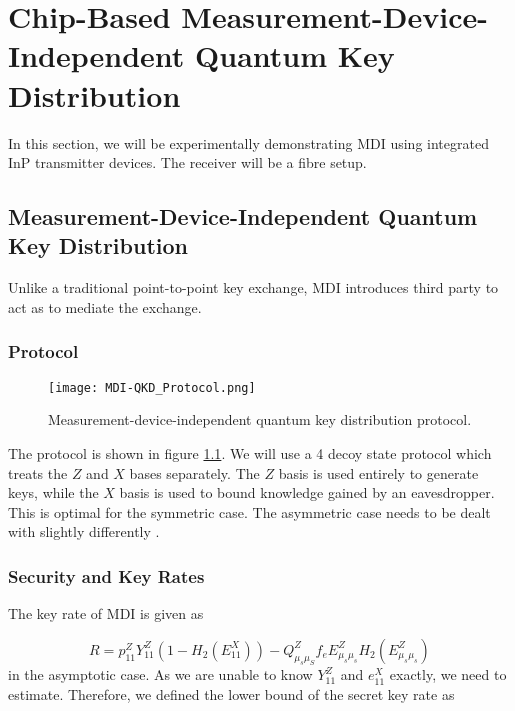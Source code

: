 %
%
\graphicspath{{./chapters/chapter04/fig04/}}

\let\textcircled=\pgftextcircled
\chapter[Chip-Based Measurement-Device-Independent QKD]{Chip-Based Measurement-Device-Independent Quantum Key Distribution}
\label{chap:mdiqkd}

In this section, we will be experimentally demonstrating \ac{MDI} \cite{mdi-qkd} using integrated \ac{InP} transmitter devices. The receiver will be a fibre setup.

\section{Measurement-Device-Independent Quantum Key Distribution}
\label{sec:mdi-qkd}

Unlike a traditional point-to-point key exchange, \ac{MDI} introduces third party to act as to mediate the exchange.  

\subsection{Protocol}

\begin{figure}[tbp]
	\centering
	\texttt{[image: MDI-QKD\_Protocol.png]}
	\caption[MDI-QKD protocol]{Measurement-device-independent quantum key distribution protocol.}
	\label{fig:mdi_protocol}
\end{figure}

The protocol is shown in figure \ref{fig:mdi_protocol}. We will use a 4 decoy state protocol \cite{zhou2016} which treats the $Z$ and $X$ bases separately. The $Z$ basis is used entirely to generate keys, while the $X$ basis is used to bound knowledge gained by an eavesdropper. This is optimal for the symmetric case. The asymmetric case needs to be dealt with slightly differently \cite{wang2018}.

\subsection{Security and Key Rates}

The key rate of \ac{MDI} is given as

\begin{equation}
	R = p_{11}^Z Y_{11}^Z \left(1 - H_2(E_{11}^X)\right) - Q_{\mu_s\mu_S}^Z f_e E_{\mu_s\mu_s}^Z H_2(E_{\mu_s\mu_s}^Z)
\end{equation}
in the asymptotic case. As we are unable to know $Y_{11}^Z$ and $e_{11}^X$ exactly, we need to estimate. Therefore, we defined the lower bound of the secret key rate as

